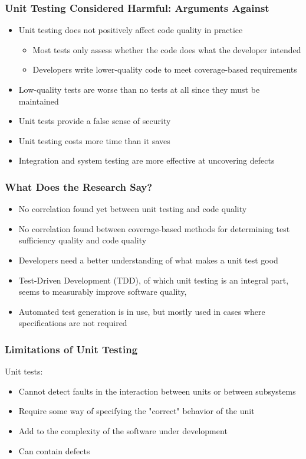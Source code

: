 \documentclass{beamer}
\begin{document}
\begin{frame}
\frametitle{Unit Testing Considered Harmful: Arguments Against}
\begin{itemize}
	\item Unit testing does not positively affect code quality in practice
	\begin{itemize}
		\item Most tests only assess whether the code does what the developer intended
		\item Developers write lower-quality code to meet coverage-based requirements
	\end{itemize}
	\item Low-quality tests are worse than no tests at all since they must be maintained
	\item Unit tests provide a false sense of security
	\item Unit testing costs more time than it saves
	\item Integration and system testing are more effective at uncovering defects
\end{itemize}
\end{frame}

\begin{frame}
\frametitle{What Does the Research Say?}
\begin{itemize}
	\item No correlation found yet between unit testing and code quality\cite{codeQual}
	\item No correlation found between coverage-based methods for determining test sufficiency  quality and code quality\cite{codeQual}
	\item Developers need a better understanding of what makes a unit test good\cite{unitTestSurv}
	\item Test-Driven Development (TDD), of which unit testing is an integral part, seems to measurably improve software quality\cite{TDDQual},\cite{doesTDDWork}
	\item Automated test generation is in use, but mostly used in cases where specifications are not required\cite{unitTestSurv}
\end{itemize}
\end{frame}


\begin{frame}
\frametitle{Limitations of Unit Testing}
Unit tests:
\begin{itemize}
	\item Cannot detect faults in the interaction between units or between subsystems
	\item Require some way of specifying the "correct" behavior of the unit
	\item Add to the complexity of the software under development
	\item Can contain defects
\end{itemize}
\end{frame}
\end{document}
